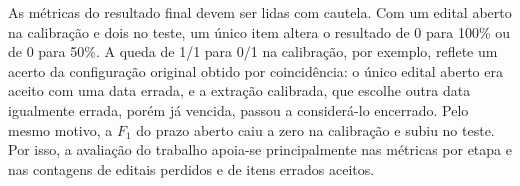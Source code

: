 As métricas do resultado final devem ser lidas com cautela. Com um edital aberto
na calibração e dois no teste, um único item altera o resultado de 0 para 100\%
ou de 0 para 50\%. A queda de 1/1 para 0/1 na calibração, por exemplo, reflete
um acerto da configuração original obtido por coincidência: o único edital
aberto era aceito com uma data errada, e a extração calibrada, que escolhe
outra data igualmente errada, porém já vencida, passou a considerá-lo
encerrado. Pelo mesmo motivo, a
$F_1$ do prazo aberto caiu a zero na calibração e subiu no teste. Por isso, a
avaliação do trabalho apoia-se principalmente nas métricas por etapa e nas
contagens de editais perdidos e de itens errados aceitos.
